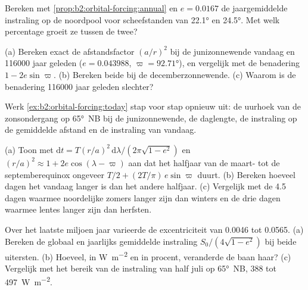 \begin{exercise}[$\star$]\label{exo:b2:orbital-forcing:4}
Bereken met \cref{prop:b2:orbital-forcing:annual} en $e = 0.0167$ de jaargemiddelde instraling op
de noordpool voor scheefstanden van \ang{22.1} en \ang{24.5}. Met welk percentage groeit ze tussen
de twee?
\end{exercise}

\begin{exercise}[$\star\star$]\label{exo:b2:orbital-forcing:5}
(a) Bereken exact de afstandsfactor $(a/r)^2$ bij de junizonnewende vandaag en \num{116000} jaar
geleden ($e = 0.043988$, $\varpi = \ang{92.71}$), en vergelijk met de benadering $1 -
2e\sin\varpi$. (b) Bereken beide bij de decemberzonnewende. (c) Waarom is de benadering \num{116000}
jaar geleden slechter?
\end{exercise}

\begin{exercise}[$\star\star$]\label{exo:b2:orbital-forcing:6}
Werk \cref{ex:b2:orbital-forcing:today} stap voor stap opnieuw uit: de uurhoek van de zonsondergang op \ang{65}~NB
bij de junizonnewende, de daglengte, de instraling op de gemiddelde afstand en de
instraling van vandaag.
\end{exercise}

\begin{exercise}[$\star\star$]\label{exo:b2:orbital-forcing:7}
(a) Toon met $\mathrm dt = T(r/a)^2\,\mathrm d\lambda/(2\pi\sqrt{1 - e^2})$ en $(r/a)^2 \approx 1 +
2e\cos(\lambda - \varpi)$ aan dat het halfjaar van de maart- tot de septemberequinox
ongeveer $T/2 + (2T/\pi)\,e\sin\varpi$ duurt. (b) Bereken hoeveel dagen het vandaag langer is dan het andere halfjaar.
(c) Vergelijk met de 4.5 dagen waarmee noordelijke zomers langer zijn dan winters en de drie dagen waarmee
lentes langer zijn dan herfsten.
\end{exercise}

\begin{exercise}[$\star\star$]\label{exo:b2:orbital-forcing:8}
Over het laatste miljoen jaar varieerde de excentriciteit van \num{0.0046} tot \num{0.0565}. (a) Bereken
de globaal en jaarlijks gemiddelde instraling $S_0/(4\sqrt{1 - e^2})$ bij beide uitersten. (b) Hoeveel, in
\unit{W.m^{-2}} en in procent, veranderde de baan haar? (c) Vergelijk met het bereik van de
instraling van half juli op \ang{65}~NB, 388 tot \qty{497}{W.m^{-2}}.
\end{exercise}

